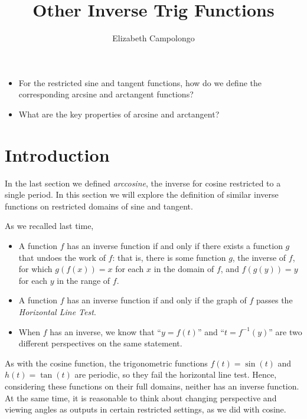 \documentclass{ximera}
\author{Elizabeth Campolongo}
\title{Other Inverse Trig Functions}
\begin{document}
\begin{abstract}
  
\end{abstract}
\maketitle



\begin{motivatingQuestions}\begin{itemize}
\item For the restricted sine and tangent functions, how do we define the corresponding arcsine and arctangent functions?
\item What are the key properties of arcsine and arctangent?
\end{itemize}\end{motivatingQuestions}






\section{Introduction}
In the last section we defined {\it arccosine}, the inverse for cosine restricted to a single period. In this section we will explore the definition of similar inverse functions on restricted domains of sine and tangent. 

As we recalled last time,
\begin{itemize}
\item
A function $f$ has an inverse function if and only if there exists a function $g$ that undoes the work of $f$: that is, there is some function $g$, the inverse of $f$, for which $g(f(x)) = x$ for each $x$ in the domain of $f$, and $f(g(y)) = y$ for each $y$ in the range of $f$. 
%
\item A function $f$ has an inverse function if and only if the graph of $f$ passes the {\it Horizontal Line Test}.
%
\item When $f$ has an inverse, we know that ``$y = f(t)$'' and ``$t = f^{-1}(y)$'' are two different perspectives on the same statement.
\end{itemize}
%
\par
As with the cosine function, the trigonometric functions $f(t) = \sin(t)$ and $h(t) = \tan(t)$ are periodic, so they fail the horizontal line test. Hence, considering these functions on their full domains, neither has an inverse function. At the same time, it is reasonable to think about changing perspective and viewing angles as outputs in certain restricted settings, as we did with cosine. 
\end{document}
